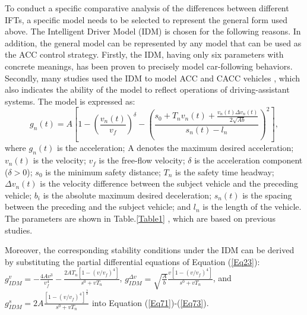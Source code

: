 \documentclass[journal]{IEEEtran}
\begin{document}
To conduct a specific comparative analysis of the differences between different IFTs, a specific model needs to be selected to represent the general form used above. The Intelligent Driver Model (IDM) is chosen for the following reasons. In addition, the general model can be represented by any model that can be used as the ACC control strategy. Firstly, the IDM, having only six parameters with concrete meanings, has been proven to precisely model car-following behaviors. Secondly, many studies used the IDM to model ACC and CACC vehicles \citep{chang2020analysis,li2017evaluation}, which also indicates the ability of the model to reflect operations of driving-assistant systems. The model is expressed as:
\begin{equation}
  g_{n}(t)=A\left[1-\left(\frac{v_{n}(t)}{v_{f}}\right)^{\delta}-\left(\frac{s_{0}+T_{n} v_{n}(t)+\frac{v_{n}(t) \Delta v_{n}(t)}{2 \sqrt{A b}}}{s_{n}(t)-l_{n}}\right)^{2}\right],
  \label{Eq23}
\end{equation}
where $g_n (t)$ is the acceleration; A denotes the maximum desired acceleration; $v_n (t)$ is the velocity; $v_f$ is the free-flow velocity; $\delta$ is the acceleration component ($\delta>0$); $s_0$ is the minimum safety distance; $T_n$ is the safety time headway; $\Delta v_n (t)$ is the velocity difference between the subject vehicle and the preceding vehicle; $b_i$ is the absolute maximum desired deceleration; $s_n (t)$ is the spacing between the preceding and the subject vehicle; and $l_n$ is the length of the vehicle. The parameters are shown in Table.\ref{Table1} \citep{kesting2008adaptive,kesting2007jam}, which are based on previous studies.

Moreover, the corresponding stability conditions under the IDM can be derived by substituting the partial differential equations of Equation (\ref{Eq23}): ${g_{IDM}^v =  - \frac{{4A{v^3}}}{{v_f^4}} - \frac{{2A{T_n}\left[ {1 - {{\left( {v/{v_f}} \right)}^4}} \right]}}{{{s^0} + v{T_n}}}}$, ${g_{IDM}^{\Delta v} = \sqrt {\frac{A}{b}} \frac{{v\left[ {1 - {{\left( {v/{v_f}} \right)}^4}} \right]}}{{{s^0} + v{T_n}}}}$, and ${g_{IDM}^s = 2A\frac{{{{\left[ {1 - {{\left( {v/{v_f}} \right)}^4}} \right]}^{\frac{3}{2}}}}}{{{s^0} + v{T_n}}}}$ into Equation (\ref{Eq71})-(\ref{Eq73}).

\begin{table}
  \centering
  \setlength{\abovecaptionskip}{0pt}
  \setlength{\belowcaptionskip}{10pt}%
  \caption{Parameters chosen for IDM.}
  \label{Table1}
\end{table}
\end{document}
